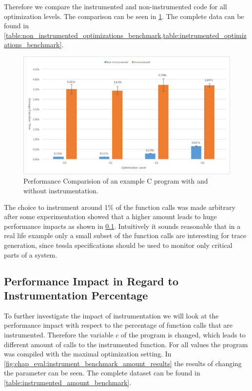Therefore we compare the instrumented and non-instrumented code for all optimization levels.
The comparison can be seen in \cref{fig:chap_eval:instrument_benchmark_results}.
The complete data can be found in \cref{table:non_instrumented_optimizations_benchmark,table:instrumented_optimizations_benchmark}.

\begin{figure}
  \includegraphics[width=\textwidth]{gfx/instrumentation_time_benchmark}
  \caption{Performance Comparision of an example C program with and without instrumentation.}
\label{fig:chap_eval:instrument_benchmark_results}
\end{figure}

The choice to instrument around 1\% of the function calls was made arbitrary after some experimentation showed that a higher amount leads to huge performance impacts as shown in \cref{sec:evaluation:instrumentation_benchmark:instr_amount}.
Intuitively it sounds reasonable that in a real life example only a small subset of the function calls are interesting for trace generation, since \gls{tessla} specifications should be used to monitor only critical parts of a system.

\subsection{Performance Impact in Regard to Instrumentation Percentage}
\label{sec:evaluation:instrumentation_benchmark:instr_amount}

To further investigate the impact of instrumentation we will look at the performance impact with respect to the percentage of function calls that are instrumented.
Therefore the variable \(c\) of the program is changed, which leads to different amount of calls to the instrumented function.
For all values the program was compiled with the maximal optimization setting.
In \cref{fig:chap_eval:instrument_benchmark_amount_results} the results of changing the parameter can be seen.
The complete dataset can be found in \cref{table:instrumented_amount_benchmark}.

